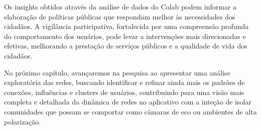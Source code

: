 Os insights obtidos através da análise de dados do Colab podem informar a elaboração de políticas públicas que respondam melhor às necessidades dos cidadãos. A vigilância participativa, fortalecida por uma compreensão profunda do comportamento dos usuários, pode levar a intervenções mais direcionadas e efetivas, melhorando a prestação de serviços públicos e a qualidade de vida dos cidadãos.

No próximo capítulo, avançaremos na pesquisa ao apresentar uma análise exploratória das redes, buscando identificar e refinar ainda mais os padrões de conexões, influências e clusters de usuários, contribuindo para uma visão mais completa e detalhada da dinâmica de redes no aplicativo com a inteção de isolar comunidades que possam se comportar como câmaras de eco ou ambientes de alta polarização.